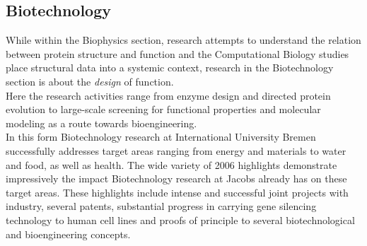 \subsection{Biotechnology}

While within the Biophysics section, research attempts to understand the relation between protein structure and function and the Computational Biology studies place structural data into a systemic context, research in the Biotechnology section is about the \textit{design} of function.\\

Here the research activities range from enzyme design and directed protein evolution to large-scale screening for functional properties and molecular modeling as a route towards bioengineering.\\

In this form Biotechnology research at International University Bremen successfully addresses target areas ranging from energy and materials to water and food, as well as health. The wide variety of 2006 highlights demonstrate impressively the impact Biotechnology research at Jacobs already has on these target areas. These highlights include intense and successful joint projects with industry, several patents, substantial progress in carrying gene silencing technology to human cell lines and proofs of principle to several biotechnological and bioengineering concepts.\\
